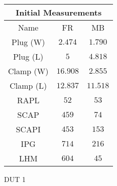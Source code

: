     \begin{tabular}{|| c | c | c ||}
    \hline
    \multicolumn{3}{||c||}{Initial Measurements} \\ [0.5ex] \hline\hline
    Name & FR & MB \\\hline
    Plug (W) & $2.474$ & $1.790$ \\
    Plug (L) & $5$ & $4.818$ \\
    Clamp (W) & $16.908$ & $2.855$ \\
    Clamp (L) & $12.837$ & $11.518$ \\
    RAPL & $52$ & $53$ \\
    SCAP & $459$ & $74$ \\
    SCAPI & $453$ & $153$ \\
    IPG & $714$ & $216$ \\
    LHM & $604$ & $45$ \\\hline
    \end{tabular}
    \caption{DUT 1}
    \label{tab:initial-measurements-exp-2-dut-1}
